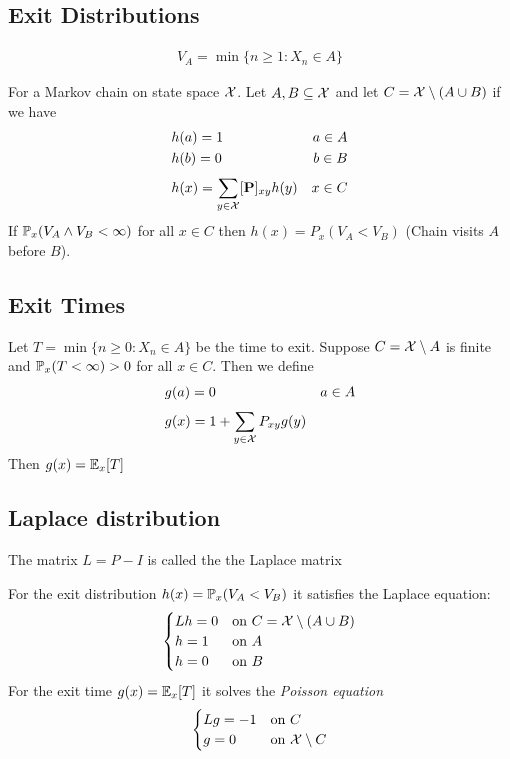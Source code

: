 \documentclass[12pt,a4paper]{article}
\begin{document}
\subsection{Exit Distributions}
\begin{defn}
\begin{align*}
V_A = \min \{n\geq 1 : X_n \in A\}
\end{align*}
\end{defn}
\begin{thm}
For a Markov chain on state space $\cal X$. Let $A, B \subseteq \cal X$ and let $C = {\cal X}\setminus (A\cup B)$ if we have 
\begin{align*}
&h(a) = 1 & a\in A\\
&h(b) = 0 & b\in B\\
&h(x) = \nsum{y\in {\cal X}}{}[\vb P]_{xy}h(y) & x\in C
\end{align*}
If $\P_x(V_A \wedge V_B < \infty)$ for all $x\in C$ then $h(x) = P_x(V_A < V_B)$ (Chain visits $A$ before $B$). 
\end{thm}

\subsection{Exit Times}
\begin{thm}
Let $T = \min\{n\geq 0 : X_n \in A\}$ be the time to exit. Suppose $C = {\cal X}\setminus A$ is finite and $\P_x(T < \infty)>0$ for all $x\in C$. Then we define 
\begin{align*}
&g(a) = 0 & a\in A\\
&g(x) = 1 + \nsum{y\in {\cal X}}{}P_{xy}g(y)
\end{align*}
Then $g(x) = \E_x[T]$
\end{thm}
\subsection{Laplace distribution}
\begin{defn}
The matrix $L = P - I$ is called the the Laplace matrix
\end{defn}
For the exit distribution $h(x) = \P_x(V_A < V_B)$ it satisfies the Laplace equation: 
\begin{align*}
\begin{cases}
Lh = 0 & \text{on $C = {\cal X}\setminus (A\cup B)$}\\
h = 1 & \text{on $A$}\\
h = 0 & \text{on $B$}
\end{cases}
\end{align*}
For the exit time $g(x) = \E_x[T]$ it solves the \textit{Poisson equation}
\begin{align*}
\begin{cases}
Lg = -1 & \text{on $C$}\\
g = 0 & \text{on ${\cal X}\setminus C$}
\end{cases}
\end{align*}
\end{document}
